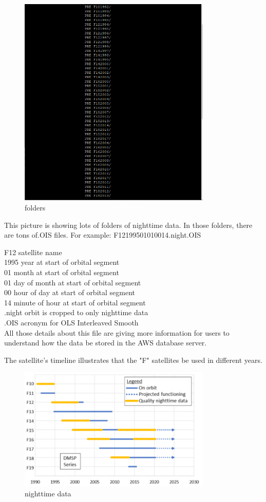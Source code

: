 \documentclass[conference]{IEEEtran}
\begin{document}
\begin{figure}[htbp]
    \centerline{\includegraphics[width=260pt]{images/2.png}}
    \caption{folders}
    \label{folders}
\end{figure}

This picture is showing lots of folders of nighttime data.  In those folders, there are tons of.OIS files. 
For example: F12199501010014.night.OIS 

F12 \-\> satellite name \\
1995 \-\> year at start of orbital segment \\
01 \-\> month at start of orbital segment \\
01 \-\> day of month at start of orbital segment \\
00 \-\> hour of day at start of orbital segment \\
14 \-\> minute of hour at start of orbital segment \\
.night \-\> orbit is cropped to only nighttime data \\
.OIS \-\> acronym for OLS Interleaved Smooth \\

All those details about this file are giving more information for users to understand how the data be stored in the AWS database server. 

The satellite's timeline illustrates that the "F" satellites be used in different years.

\begin{figure}[htbp]
\centerline{\includegraphics[width=260pt]{images/2.1.png}}
\caption{nighttime data}
\label{nighttimedata}
\end{figure}
\end{document}
